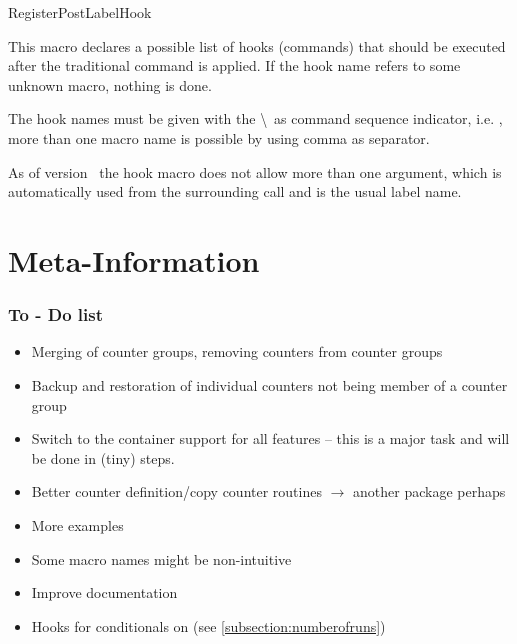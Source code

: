 \documentclass[12pt,a4paper,oneside]{article}
\makeatletter
\newcommand{\chdocextractversion}[1]{%
  \@nameuse{#1}%
}
\newcommand{\CHDocNew}[1]{%
  \tcbdocmarginnote[doclang/new={N},
  colframe=blue,
  halign=left,
  colback={blue!20!white},
  fontupper={\tiny}
  ]{%
    \chdocextractversion{xassoccntversion#1}%
  }%
}
\def\packageversion{\xassoccntpackageversion}%
\makeatother
\begin{document}
\begin{docCommand}[before={\CHDocNew{1.3}}]{RegisterPostLabelHook}{}

This macro declares a possible list of hooks (commands) that should be executed after the traditional  command is applied. If the hook name refers to some unknown macro, nothing is done. 

The hook names must be given with the \textbackslash\ as command sequence indicator, i.e. , more than one macro name is possible by using comma as separator. 

As of version \packageversion\ the hook macro does not allow more than one argument, which is automatically used from the surrounding  call and is the usual label name. 

\end{docCommand}





\clearpage
\part{Meta-Information}

\parttoc

\clearpage
\section{To - Do list}

\begin{itemize}
\item Merging of counter groups, removing counters from counter groups
\item Backup and restoration of individual counters not being member of a counter group
\item Switch to the container support for all features -- this is a major task and will be done in (tiny) steps. 
\item Better counter definition/copy counter routines \(\longrightarrow\) another package perhaps
\item More examples 
\item Some macro names might be non-intuitive
\item Improve documentation
\item Hooks for conditionals on  (see \cref{subsection:numberofruns})


\end{itemize}
\end{document}
